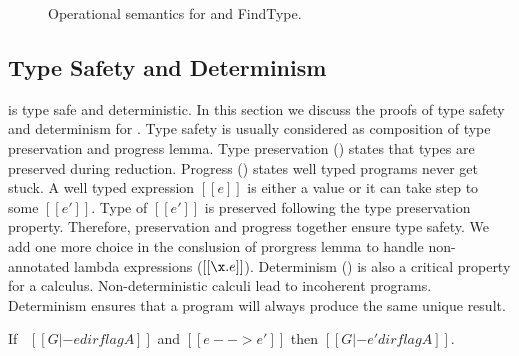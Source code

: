 \begin{figure}[t]
  \begin{small}
    \centering
  \end{small}
  \begin{small}
    \centering
  \end{small}
  \caption{Operational semantics for \cal and FindType.}
  \label{fig:union:os}
\end{figure}


\subsection{Type Safety and Determinism}
\label{sec:union:safety}
\cal is type safe and deterministic. In this section we discuss the
proofs of type safety and determinism for \cal. Type safety is usually considered as composition
of type preservation and progress lemma. Type preservation ()
states that types are preserved during
reduction. Progress () states well typed programs never get stuck.
A well typed expression $[[e]]$ is
either a value or it can take step to some $[[e']]$. Type of $[[e']]$ is preserved following the
type preservation property. Therefore, preservation and progress together ensure type safety.
We add one more choice in the conslusion of prorgress lemma to handle non-annotated lambda expressions
($[[\x.e]]$).
Determinism () is also a critical property for a calculus.
Non-deterministic calculi lead to incoherent programs.
Determinism ensures that a program will always produce the same unique result.

\begin{lemma}
\label{lemma:union:preservation}
  If \ $[[G |- e dirflag A]]$ and $[[e --> e']]$ then $[[G |- e' dirflag A]]$.
\end{lemma}

